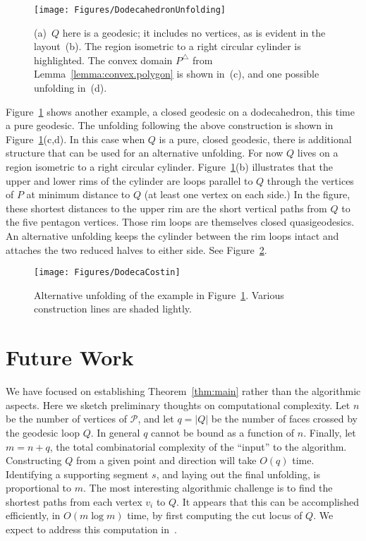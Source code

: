 \pdfoutput=1  \documentclass[]{article}
\newcommand{\figlab}[1]{\label{fig:#1}}
\newcommand{\lemref}[1]{\ref{lemma:#1}}
\newcommand{\thmref}[1]{\ref{thm:#1}}
\newcommand{\figref}[1]{\ref{fig:#1}}
\def\P{{\mathcal P}}
\begin{document}
\begin{figure}[htbp]
\centering
\texttt{[image: Figures/DodecahedronUnfolding]}
\caption{(a)~$Q$ here is a geodesic; it includes no vertices, as is
evident in the layout~(b).
The region isometric to a right
circular cylinder is highlighted.
The convex domain $P^\triangle$
from Lemma~\protect\lemref{convex.polygon}
is shown in~(c),
and one possible unfolding in~(d).
}
\figlab{DodecahedronUnfolding}
\end{figure}



Figure~\figref{DodecahedronUnfolding} shows another
example, a closed geodesic on a dodecahedron, this time a pure geodesic.
The unfolding following the above construction is shown
in Figure~\figref{DodecahedronUnfolding}(c,d).
In this case when
$Q$ is a pure, closed geodesic, there is additional structure that
can be used for an alternative unfolding.
For now $Q$
lives on a region isometric to a right
circular cylinder. 
Figure~\figref{DodecahedronUnfolding}(b)
illustrates that
the upper and lower rims of the cylinder are loops
parallel to $Q$ through the vertices of $P$ at minimum distance
to $Q$ (at least one vertex on each side.) 
In the figure, these
shortest distances to the upper rim are the short vertical paths from $Q$
to the five pentagon vertices.
Those rim loops are themselves
closed quasigeodesics.
An alternative unfolding keeps the cylinder between the rim loops intact
and attaches the two reduced halves to either side.
See Figure~\figref{DodecaCostin}.
\begin{figure}[htbp]
\centering
\texttt{[image: Figures/DodecaCostin]}
\caption{Alternative unfolding of the example in
Figure~\protect\figref{DodecahedronUnfolding}.
Various construction lines are shaded lightly.
}
\figlab{DodecaCostin}
\end{figure}


\section{Future Work}
We have focused on establishing Theorem~\thmref{main} rather than the algorithmic
aspects.  Here we sketch preliminary thoughts on computational complexity.
Let $n$ be the number of vertices of $\P$, and
let $q=|Q|$ be the number of faces crossed by the
geodesic loop $Q$.
In general $q$ cannot be bound as a function of $n$.
Finally, let $m=n+q$, the total combinatorial complexity
of the ``input'' to the algorithm.
Constructing $Q$ from a given point and direction will
take $O(q)$ time.
Identifying a supporting segment $s$, and laying out the final
unfolding, is proportional to $m$.
The most interesting algorithmic challenge is to find the shortest
paths from each vertex $v_i$ to $Q$.
It appears that this can be accomplished efficiently,
in $O(m \log m)$ time, by first computing the cut locus of $Q$.
We expect to address this computation in~\cite{iov-ucpqsu-08b}.
\end{document}
